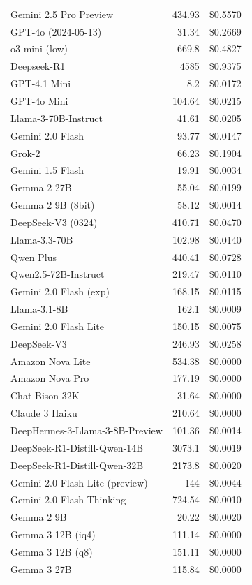 \documentclass[11pt]{article}
\begin{document}
\begin{table}[htbp]
{\begin{tabular}{lrr}
Gemini 2.5 Pro Preview & 434.93 & \$0.5570 \\
GPT-4o (2024-05-13) & 31.34 & \$0.2669 \\
o3-mini (low) & 669.8 & \$0.4827 \\
Deepseek-R1 & 4585 & \$0.9375 \\
GPT-4.1 Mini & 8.2 & \$0.0172 \\
GPT-4o Mini & 104.64 & \$0.0215 \\
Llama-3-70B-Instruct & 41.61 & \$0.0205 \\
Gemini 2.0 Flash & 93.77 & \$0.0147 \\
Grok-2 & 66.23 & \$0.1904 \\
Gemini 1.5 Flash & 19.91 & \$0.0034 \\
Gemma 2 27B & 55.04 & \$0.0199 \\
Gemma 2 9B (8bit) & 58.12 & \$0.0014 \\
DeepSeek-V3 (0324) & 410.71 & \$0.0470 \\
Llama-3.3-70B & 102.98 & \$0.0140 \\
Qwen Plus & 440.41 & \$0.0728 \\
Qwen2.5-72B-Instruct & 219.47 & \$0.0110 \\
Gemini 2.0 Flash (exp) & 168.15 & \$0.0115 \\
Llama-3.1-8B & 162.1 & \$0.0009 \\
Gemini 2.0 Flash Lite & 150.15 & \$0.0075 \\
DeepSeek-V3 & 246.93 & \$0.0258 \\
Amazon Nova Lite & 534.38 & \$0.0000 \\
Amazon Nova Pro & 177.19 & \$0.0000 \\
Chat-Bison-32K & 31.64 & \$0.0000 \\
Claude 3 Haiku & 210.64 & \$0.0000 \\
DeepHermes-3-Llama-3-8B-Preview & 101.36 & \$0.0014 \\
DeepSeek-R1-Distill-Qwen-14B & 3073.1 & \$0.0019 \\
DeepSeek-R1-Distill-Qwen-32B & 2173.8 & \$0.0020 \\
Gemini 2.0 Flash Lite (preview) & 144 & \$0.0044 \\
Gemini 2.0 Flash Thinking & 724.54 & \$0.0010 \\
Gemma 2 9B & 20.22 & \$0.0020 \\
Gemma 3 12B (iq4) & 111.14 & \$0.0000 \\
Gemma 3 12B (q8) & 151.11 & \$0.0000 \\
Gemma 3 27B & 115.84 & \$0.0000 \\

\end{tabular}}
\end{table}
\end{document}
